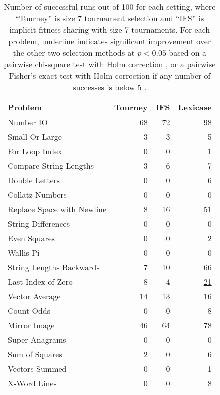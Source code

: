 \documentclass{sig-alternate}
\begin{document}
\begin{table}[t]
\centering
\caption{Number of successful runs out of 100 for each setting, where ``Tourney'' is size 7 tournament selection and ``IFS'' is implicit fitness sharing with size 7 tournaments. For each problem, underline indicates significant improvement over the other two selection methods at $p < 0.05$ based on a pairwise chi-square test with Holm correction \cite{R}, or a pairwise Fisher's exact test with Holm correction if any number of successes is below 5 \cite{fmsb}.}
\label{tableResults}
\begin{tabular}{lrrr}
\toprule
Problem                    & Tourney & IFS & Lexicase \\
\midrule
Number IO                  & 68      & 72  & \underline{98}       \\
Small Or Large             & 3       & 3   & 5        \\
For Loop Index             & 0       & 0   & 1        \\
Compare String Lengths     & 3       & 6   & 7        \\
Double Letters             & 0       & 0   & 6        \\
Collatz Numbers            & 0       & 0   & 0        \\
Replace Space with Newline & 8       & 16  & \underline{51}       \\
String Differences         & 0       & 0   & 0        \\
Even Squares               & 0       & 0   & 2        \\
Wallis Pi                  & 0       & 0   & 0        \\
String Lengths Backwards   & 7       & 10  & \underline{66}       \\
Last Index of Zero         & 8       & 4   & \underline{21}       \\
Vector Average             & 14      & 13  & 16       \\
Count Odds                 & 0       & 0   & 8        \\
Mirror Image               & 46      & 64  & \underline{78}       \\
Super Anagrams             & 0       & 0   & 0        \\
Sum of Squares             & 2       & 0   & 6        \\
Vectors Summed             & 0       & 0   & 1        \\
X-Word Lines               & 0       & 0   & \underline{8}        \\

\end{tabular}
\end{table}
\end{document}
